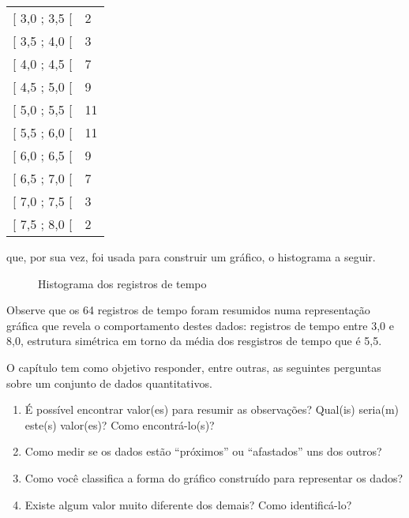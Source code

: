 \begin{savenotes}\sphinxattablestart
\centering
{}
\label{\detokenize{PE104-0:id4}}
\sphinxaftercaption
\begin{tabulary}{\linewidth}[t]{|T|T|}
\hline
{}\relax &\relax \\
\hline
{[} 3,0 ; 3,5 {[}
&
2
\\
\hline
{[} 3,5 ; 4,0 {[}
&
3
\\
\hline
{[} 4,0 ; 4,5 {[}
&
7
\\
\hline
{[} 4,5 ; 5,0 {[}
&
9
\\
\hline
{[} 5,0 ; 5,5 {[}
&
11
\\
\hline
{[} 5,5 ; 6,0 {[}
&
11
\\
\hline
{[} 6,0 ; 6,5 {[}
&
9
\\
\hline
{[} 6,5 ; 7,0 {[}
&
7
\\
\hline
{[} 7,0 ; 7,5 {[}
&
3
\\
\hline
{[} 7,5 ; 8,0 {[}
&
2
\\
\hline
\end{tabulary}
\par
\sphinxattableend\end{savenotes}

que, por sua vez, foi usada para construir um gráfico, o histograma a seguir.

\begin{figure}[H]
\centering
\capstart

\noindent{}
\caption{Histograma dos registros de tempo}\label{\detokenize{PE104-0:fig-histograma-resposta}}\label{\detokenize{PE104-0:id5}}\end{figure}

Observe que os 64 registros de tempo foram resumidos numa representação gráfica que revela o comportamento destes dados: registros de tempo entre 3,0 e 8,0, estrutura simétrica em torno da média dos resgistros de tempo que é 5,5.

O capítulo  tem como objetivo responder, entre outras, as seguintes perguntas sobre um conjunto de dados quantitativos.
\begin{enumerate}
\item {} 
É possível encontrar valor(es) para resumir as observações? Qual(is) seria(m) este(s) valor(es)? Como encontrá-lo(s)?

\item {} 
Como medir se os dados estão “próximos” ou “afastados” uns dos outros?

\item {} 
Como você classifica a forma do gráfico construído para representar os dados?

\item {} 
Existe algum valor muito diferente dos demais? Como identificá-lo?

\end{enumerate}

